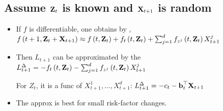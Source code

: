 \subsection*{Assume $\boldsymbol{\mathbf{Z}}_{t}$ is known and $\boldsymbol{\mathbf{X}}_{t+1}$ is random}
\begin{itemize}[leftmargin=*]
    \item If $f$ is differentiable, one obtains by ,
$
    f\left(t+1, \boldsymbol{\mathbf{Z}}_{t}+\boldsymbol{\mathbf{X}}_{t+1}\right) \approx f\left(t, \boldsymbol{\mathbf{Z}}_{t}\right)+f_{t}\left(t, \boldsymbol{\mathbf{Z}}_{t}\right)+\sum_{j=1}^{d} f_{z^{j}}\left(t, \boldsymbol{\mathbf{Z}}_{t}\right) X_{t+1}^{j}
$
    \item Then $L_{t+1}$ can be approximated by the 
$
L_{t+1}^{\Delta}=-f_{t}\left(t, \boldsymbol{\mathbf{Z}}_{t}\right)-\sum_{j=1}^{d} f_{z^{j}}\left(t, \boldsymbol{\mathbf{Z}}_{t}\right) X_{t+1}^{j}
$

For  $Z_{t}$, it is a  func of $X_{t+1}^{1}, \ldots, X_{t+1}^{d}$:
$
L_{t+1}^{\Delta}=-c_{t}-\boldsymbol{\mathbf{b}}_{t}^{\top} \boldsymbol{\mathbf{X}}_{t+1}
$
    \item The approx is best for small risk-factor changes.
\end{itemize}






